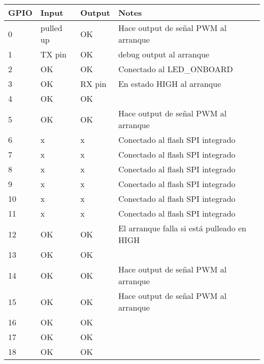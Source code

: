\documentclass[../informe_krapp.tex]{subfiles}
\begin{document}
\begin{table}[!ht]
	\centering
	\begin{tabular}{|l|l|l|l|}
		\hline
		GPIO & Input     & Output & Notes                                      \\ \hline
		0    & pulled up & OK     & Hace output de señal PWM al arranque       \\ \hline
		1    & TX pin    & OK     & debug output al arranque                   \\ \hline
		2    & OK        & OK     & Conectado al LED\_ONBOARD                  \\ \hline
		3    & OK        & RX pin & En estado HIGH al arranque                 \\ \hline
		4    & OK        & OK     & ~                                          \\ \hline
		5    & OK        & OK     & Hace output de señal PWM al arranque       \\ \hline
		6    & x         & x      & Conectado al flash SPI integrado           \\ \hline
		7    & x         & x      & Conectado al flash SPI integrado           \\ \hline
		8    & x         & x      & Conectado al flash SPI integrado           \\ \hline
		9    & x         & x      & Conectado al flash SPI integrado           \\ \hline
		10   & x         & x      & Conectado al flash SPI integrado           \\ \hline
		11   & x         & x      & Conectado al flash SPI integrado           \\ \hline
		12   & OK        & OK     & El arranque falla si está pulleado en HIGH \\ \hline
		13   & OK        & OK     & ~                                          \\ \hline
		14   & OK        & OK     & Hace output de señal PWM al arranque       \\ \hline
		15   & OK        & OK     & Hace output de señal PWM al arranque       \\ \hline
		16   & OK        & OK     & ~                                          \\ \hline
		17   & OK        & OK     & ~                                          \\ \hline
		18   & OK        & OK     & ~                                          \\ \hline

\end{tabular}
\end{table}
\end{document}

